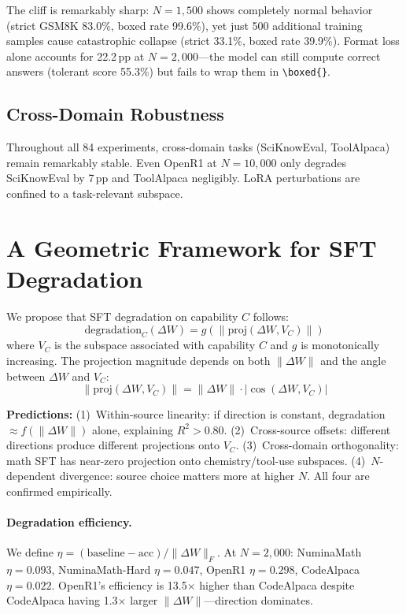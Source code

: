 \documentclass{article}
\begin{document}
The cliff is remarkably sharp: $N{=}1{,}500$ shows completely normal behavior (strict GSM8K 83.0\%, boxed rate 99.6\%), yet just 500 additional training samples cause catastrophic collapse (strict 33.1\%, boxed rate 39.9\%). Format loss alone accounts for 22.2\,pp at $N{=}2{,}000$---the model can still compute correct answers (tolerant score 55.3\%) but fails to wrap them in \texttt{\textbackslash boxed\{\}}.

\subsection{Cross-Domain Robustness}

Throughout all 84 experiments, cross-domain tasks (SciKnowEval, ToolAlpaca) remain remarkably stable. Even OpenR1 at $N{=}10{,}000$ only degrades SciKnowEval by 7\,pp and ToolAlpaca negligibly. LoRA perturbations are confined to a task-relevant subspace.

\section{A Geometric Framework for SFT Degradation}
\label{sec:framework}

We propose that SFT degradation on capability $C$ follows:
\begin{equation}
\text{degradation}_C(\Delta W) = g\!\left(\left\|\text{proj}(\Delta W, V_C)\right\|\right)
\end{equation}
where $V_C$ is the subspace associated with capability $C$ and $g$ is monotonically increasing. The projection magnitude depends on both $\|\Delta W\|$ and the angle between $\Delta W$ and $V_C$:
\begin{equation}
\left\|\text{proj}(\Delta W, V_C)\right\| = \|\Delta W\| \cdot \left|\cos(\Delta W, V_C)\right|
\end{equation}

\textbf{Predictions:} (1)~Within-source linearity: if direction is constant, degradation $\approx f(\|\Delta W\|)$ alone, explaining $R^2 > 0.80$. (2)~Cross-source offsets: different directions produce different projections onto $V_C$. (3)~Cross-domain orthogonality: math SFT has near-zero projection onto chemistry/tool-use subspaces. (4)~$N$-dependent divergence: source choice matters more at higher $N$. All four are confirmed empirically.

\paragraph{Degradation efficiency.} We define $\eta = (\text{baseline} - \text{acc}) / \|\Delta W\|_F$. At $N{=}2{,}000$: NuminaMath $\eta = 0.093$, NuminaMath-Hard $\eta = 0.047$, OpenR1 $\eta = 0.298$, CodeAlpaca $\eta = 0.022$. OpenR1's efficiency is 13.5$\times$ higher than CodeAlpaca despite CodeAlpaca having 1.3$\times$ larger $\|\Delta W\|$---direction dominates.
\end{document}
